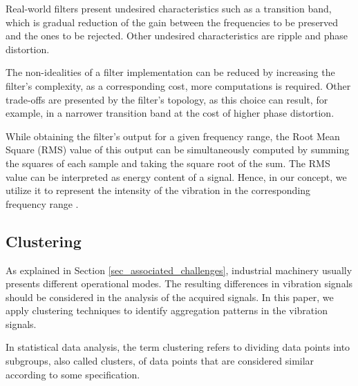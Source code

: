 \documentclass[conference]{IEEEtran}
\begin{document}
Real-world filters present undesired characteristics such as a transition band, which is gradual reduction of the gain between the frequencies to be preserved and the ones to be rejected. Other undesired characteristics are ripple and phase distortion. %

The non-idealities of a filter implementation can be reduced by increasing the filter's complexity, as a corresponding cost, more computations is required. Other trade-offs are presented by the filter's topology, as this choice can result, for example, in a narrower transition band at the cost of higher phase distortion.


While obtaining the filter's output for a given frequency range, the Root Mean Square (RMS) value of this output can be simultaneously computed by summing the squares of each sample and taking the square root of the sum. The RMS value can be interpreted as energy content of a signal. Hence, in our concept, we utilize it to represent the intensity of the vibration in the corresponding frequency range \cite{b3}.


\subsection{Clustering}
\label{sec_clustering}

As explained in Section \ref{sec_associated_challenges}, industrial machinery usually presents different operational modes. The resulting differences in vibration signals should be considered in the analysis of the acquired signals. In this paper, we apply clustering techniques to identify aggregation patterns in the vibration signals.

In statistical data analysis, the term clustering refers to dividing data points into subgroups, also called clusters, of data points that are considered similar according to some specification. 
\end{document}
